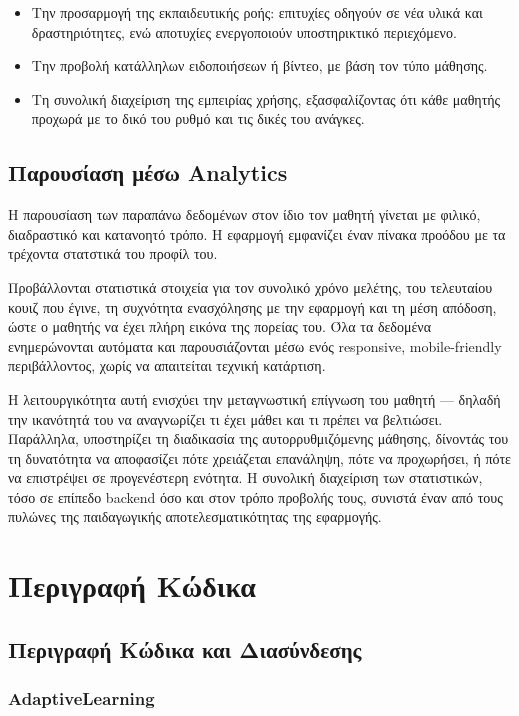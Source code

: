 \documentclass[11pt]{report}
\begin{document}
\begin{itemize}
    \item Την προσαρμογή της εκπαιδευτικής ροής: επιτυχίες οδηγούν σε νέα υλικά και δραστηριότητες, ενώ αποτυχίες ενεργοποιούν υποστηρικτικό περιεχόμενο.
    \item Την προβολή κατάλληλων ειδοποιήσεων ή βίντεο, με βάση τον τύπο μάθησης.
    \item Τη συνολική διαχείριση της εμπειρίας χρήσης, εξασφαλίζοντας ότι κάθε μαθητής προχωρά με το δικό του ρυθμό και τις δικές του ανάγκες.
\end{itemize}
  

\section{Παρουσίαση μέσω Analytics}

Η παρουσίαση των παραπάνω δεδομένων στον ίδιο τον μαθητή γίνεται με φιλικό, διαδραστικό και κατανοητό τρόπο. Η εφαρμογή εμφανίζει έναν πίνακα προόδου με τα τρέχοντα στατστικά του προφίλ του.

Προβάλλονται στατιστικά στοιχεία για τον συνολικό χρόνο μελέτης, του τελευταίου κουιζ που έγινε, τη συχνότητα ενασχόλησης με την εφαρμογή και τη μέση απόδοση, ώστε ο μαθητής να έχει πλήρη εικόνα της πορείας του. Όλα τα δεδομένα ενημερώνονται αυτόματα και παρουσιάζονται μέσω ενός responsive, mobile-friendly περιβάλλοντος, χωρίς να απαιτείται τεχνική κατάρτιση.

Η λειτουργικότητα αυτή ενισχύει την μεταγνωστική επίγνωση του μαθητή — δηλαδή την ικανότητά του να αναγνωρίζει τι έχει μάθει και τι πρέπει να βελτιώσει. Παράλληλα, υποστηρίζει τη διαδικασία της αυτορρυθμιζόμενης μάθησης, δίνοντάς του τη δυνατότητα να αποφασίζει πότε χρειάζεται επανάληψη, πότε να προχωρήσει, ή πότε να επιστρέψει σε προγενέστερη ενότητα. Η συνολική διαχείριση των στατιστικών, τόσο σε επίπεδο backend όσο και στον τρόπο προβολής τους, συνιστά έναν από τους πυλώνες της παιδαγωγικής αποτελεσματικότητας της εφαρμογής. 
\chapter{Περιγραφή Κώδικα}

\section{Περιγραφή Κώδικα και Διασύνδεσης}
\subsection{AdaptiveLearning}
\end{document}
